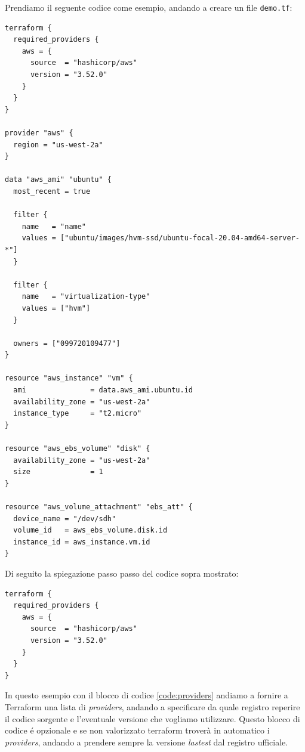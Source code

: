 \documentclass[12pt, a4paper, titlepage]{article}
\newenvironment{code}{\captionsetup{type=listing}}{}
\begin{document}
Prendiamo il seguente codice come esempio, andando a creare un file \texttt{demo.tf}:
\begin{code}
	\begin{verbatim}
terraform {
  required_providers {
    aws = {
      source  = "hashicorp/aws"
      version = "3.52.0"
    }
  }
}

provider "aws" {
  region = "us-west-2a"
}

data "aws_ami" "ubuntu" {
  most_recent = true

  filter {
    name   = "name"
    values = ["ubuntu/images/hvm-ssd/ubuntu-focal-20.04-amd64-server-*"]
  }

  filter {
    name   = "virtualization-type"
    values = ["hvm"]
  }

  owners = ["099720109477"]
}

resource "aws_instance" "vm" {
  ami               = data.aws_ami.ubuntu.id
  availability_zone = "us-west-2a"
  instance_type     = "t2.micro"
}

resource "aws_ebs_volume" "disk" {
  availability_zone = "us-west-2a"
  size              = 1
}

resource "aws_volume_attachment" "ebs_att" {
  device_name = "/dev/sdh"
  volume_id   = aws_ebs_volume.disk.id
  instance_id = aws_instance.vm.id
}
	\end{verbatim}
\end{code}
\bigskip

Di seguito la spiegazione passo passo del codice sopra mostrato:

\begin{code}
	\begin{verbatim}
terraform {
  required_providers {
    aws = {
      source  = "hashicorp/aws"
      version = "3.52.0"
    }
  }
}
	\end{verbatim}
\end{code}
\bigskip

In questo esempio con il blocco di codice \ref{code:providers} andiamo a fornire a Terraform una lista di \textit{providers}, andando a specificare da quale registro reperire il codice sorgente e l'eventuale versione  che vogliamo utilizzare. Questo blocco di codice é opzionale e se non valorizzato terraform troverà in automatico i \textit{providers}, andando a prendere sempre la versione \textit{lastest} dal registro ufficiale\cite{terraform_registry}. 
\end{document}
